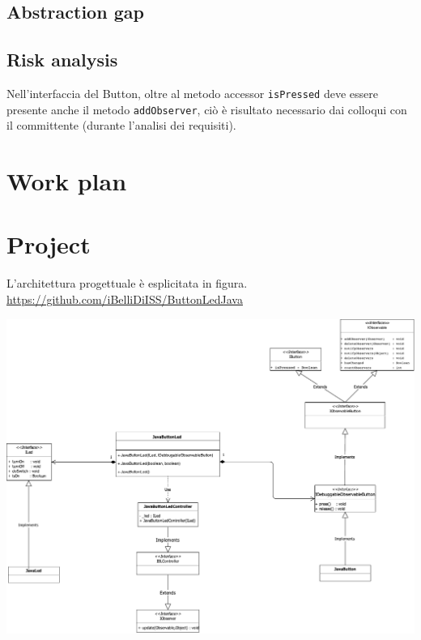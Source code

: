 \documentclass{llncs}
\newcommand{\labelsec}[1]{\label{sec:#1}}
\begin{document}
\subsection{Abstraction gap}

\subsection{Risk analysis}
Nell'interfaccia del Button, oltre al metodo accessor \texttt{isPressed} deve essere presente anche il metodo \texttt{addObserver}, ci\`o \`e risultato necessario dai colloqui con il committente (durante l'analisi dei requisiti).
\section{Work plan}
\labelsec{wplan}

\section{Project}
\labelsec{Project}
L'architettura progettuale \`e esplicitata in figura.\\
\url{https://github.com/iBelliDiISS/ButtonLedJava}
\begin{center}
\includegraphics[scale=0.6]{img/graphs/Progettazione_BLS.pdf}
\end{center}
\end{document}
